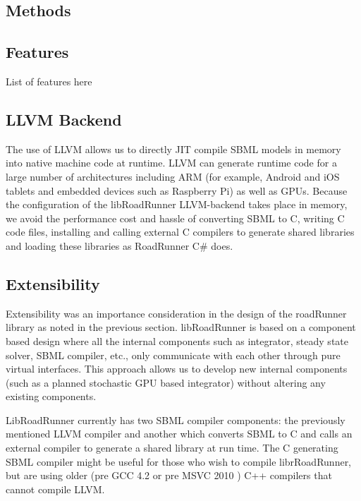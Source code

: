 \documentclass{bioinfo}
\begin{document}
\begin{methods}
\section{Methods}

\subsection{Features}

List of features here

\subsection{LLVM Backend}

The use of LLVM allows us to directly JIT compile SBML models in memory into native machine code at runtime. LLVM can generate runtime code for a large number of architectures including ARM (for example, Android and iOS tablets and embedded devices such as Raspberry Pi) as well as GPUs. Because the configuration of the libRoadRunner LLVM-backend takes place in memory, we avoid the performance cost and hassle of converting SBML to C, writing C code files, installing and calling external C compilers to generate shared libraries and loading these libraries as RoadRunner C\# does.  

\subsection{Extensibility} 

Extensibility was an importance consideration in the design of the roadRunner library as noted in the previous section. libRoadRunner is based on a component based design where all the internal components such as integrator, steady state solver, SBML compiler, etc., only communicate with each other through pure virtual interfaces. This approach allows us to develop new internal components (such as a planned stochastic GPU based integrator) without altering any existing components. 

LibRoadRunner currently has two SBML compiler components: the previously mentioned LLVM compiler and another which converts SBML to C and calls an external compiler to generate a shared library at run time. The C generating SBML compiler might be useful for those who wish to compile librRoadRunner, but are using older (pre GCC 4.2 or pre MSVC 2010 ) C++ compilers that cannot compile LLVM.  


\end{methods}
\end{document}
